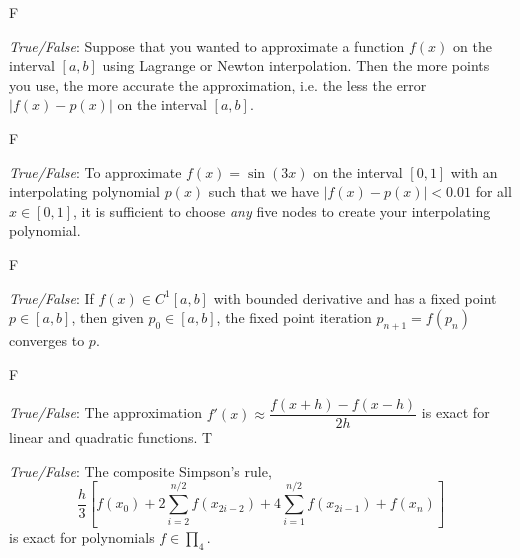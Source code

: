 \documentclass[11pt,letterpaper]{article}
\begin{document}
F


\quizsol \textit{True/False}: Suppose that you wanted to approximate a function $f(x)$ on the interval $[a, b]$ using Lagrange or Newton interpolation. Then the more points you use, the more accurate the approximation, i.e. the less the error $|f(x) - p(x)|$ on the interval $[a, b]$. 

F



\quizsol \textit{True/False}: To approximate $f(x)= \sin(3x)$ on the interval $[0, 1]$ with an interpolating polynomial $p(x)$ such that we have $|f(x) - p(x)| < 0.01$ for all $x \in [0, 1]$, it is sufficient to choose \textit{any} five nodes to create your interpolating polynomial. 

F


\quizsol \textit{True/False}: If $f(x) \in C^1[a, b]$ with bounded derivative and has a fixed point $p \in [a, b]$, then given $p_0 \in [a, b]$, the fixed point iteration $p_{n+1}= f(p_n)$ converges to $p$. 

F


\quizsol \textit{True/False}: The approximation $f'(x) \approx \dfrac{f(x + h) - f(x - h)}{2h}$ is exact for linear and quadratic functions. 
T



\quizsol \textit{True/False}: The composite Simpson's rule, 
	\[
	\dfrac{h}{3} \left[ f(x_0) + 2 \sum_{i=2}^{n/2} f(x_{2i-2}) + 4 \sum_{i=1}^{n/2} f(x_{2i-1}) + f(x_n) \right]
	\]
is exact for polynomials $f \in \prod_4$. 
\end{document}
